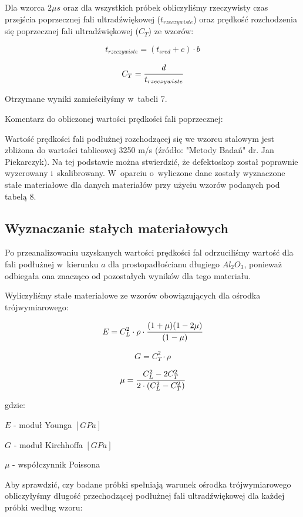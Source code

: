 \documentclass[a4paper,12pt]{article}
\begin{document}
Dla wzorca $2\mu s$ oraz dla wszystkich próbek obliczyliśmy rzeczywisty czas przejścia poprzecznej fali ultradźwiękowej ($t_{rzeczywiste}$) oraz prędkość rozchodzenia się poprzecznej fali ultradźwiękowej ($C_T$) ze wzorów:

$$t_{rzeczywiste}=(t_{sred}+c)\cdot b$$

$$C_T=\cfrac{d}{t_{rzeczywiste}}$$

Otrzymane wyniki zamieściłyśmy w~tabeli 7.



Komentarz do obliczonej wartości prędkości fali poprzecznej:

Wartość prędkości fali  podłużnej rozchodzącej się we wzorcu stalowym jest zbliżona do wartości tablicowej 3250 m/s (źródło: "Metody Badań" dr. Jan Piekarczyk). Na tej podstawie można stwierdzić, że defektoskop został poprawnie wyzerowany i~skalibrowany.
W~oparciu o~wyliczone dane zostały wyznaczone stałe materiałowe dla danych materiałów przy użyciu wzorów podanych pod tabelą 8.
\newpage

\subsection{Wyznaczanie stałych materiałowych}

Po przeanalizowaniu uzyskanych wartości prędkości fal odrzuciliśmy wartość dla fali podłużnej w~kierunku $a$ dla prostopadłościanu długiego $Al_2O_3$, ponieważ odbiegała ona znacząco od pozostałych wyników dla tego materiału.





Wyliczyliśmy stałe materiałowe ze wzorów obowiązujących dla ośrodka trójwymiarowego:

$$E=C_L^2\cdot \rho \cdot \cfrac{(1+\mu)(1-2\mu)}{(1-\mu)}$$

$$G=C_T^2\cdot \rho$$

$$\mu = \cfrac{C_L^2-2C_T^2}{2\cdot (C_L^2-C_T^2)}$$

gdzie:

$E$ - moduł Younga $[GPa]$

$G$ - moduł Kirchhoffa $[GPa]$

$\mu$ - współczynnik Poissona





Aby sprawdzić, czy badane próbki spełniają warunek ośrodka trójwymiarowego obliczyłyśmy długość przechodzącej podłużnej fali ultradźwiękowej dla każdej próbki według wzoru:
\end{document}
